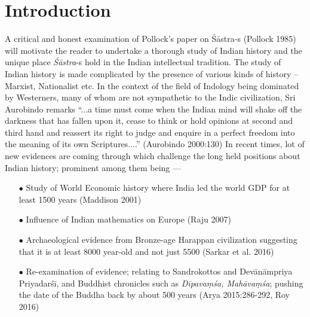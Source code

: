 \section{Introduction}\label{art12-sec1}

A critical and honest examination of Pollock's paper on Śāstra-s (Pollock 1985) will motivate the reader to undertake a thorough study of Indian history and the unique place {\sl Śāstra}-s hold in the Indian intellectual tradition. The study of Indian history is made complicated by the presence of various kinds of history -- Marxist, Nationalist etc. In the context of the ﬁeld of Indology being dominated by Westerners, many of whom are not sympathetic to the Indic civilization, Sri Aurobindo remarks ``...a time must come when the Indian mind will shake off the darkness that has fallen upon it, cease to think or hold opinions at second and third hand and reassert its right to judge and enquire in a perfect freedom into the meaning of its own Scriptures....'' (Aurobindo 2000:130) In recent times, lot of new evidences are coming through which challenge the long held positions about Indian history; prominent among them being ---
\begin{itemize}
\item[$\bullet$] Study of World Economic history where India led the world GDP for at least 1500 years (Maddison 2001)

\item[$\bullet$] Inﬂuence of Indian mathematics on Europe (Raju 2007)

\item[$\bullet$] Archaeological evidence from Bronze-age Harappan civilization suggesting that it is at least 8000 year-old and not just 5500 (Sarkar et al. 2016)

\item[$\bullet$] Re-examination of evidence; relating to Sandrokottos and Devānāmpriya Priyadarśī, and Buddhist chronicles such as {\sl Dīpavaṃśa, Mahāvaṃśa}; pushing the date of the Buddha back by about 500 years (Arya 2015:286-292, Roy 2016)
\end{itemize}

\newpage

